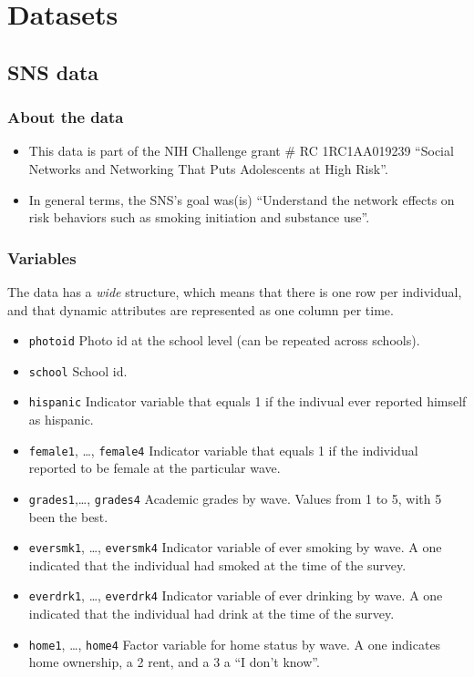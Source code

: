 \documentclass[]{book}
\theoremstyle{definition}
\theoremstyle{definition}
\theoremstyle{definition}
\theoremstyle{remark}
\begin{document}
\cleardoublepage 

\appendix


\chapter{Datasets}\label{datasets}

\hypertarget{sns-data}{\section{SNS data}\label{sns-data}}

\subsection{About the data}\label{about-the-data}

\begin{itemize}
\item
  This data is part of the NIH Challenge grant \# RC 1RC1AA019239
  ``Social Networks and Networking That Puts Adolescents at High Risk''.
\item
  In general terms, the SNS's goal was(is) ``Understand the network
  effects on risk behaviors such as smoking initiation and substance
  use''.
\end{itemize}

\subsection{Variables}\label{variables}

The data has a \emph{wide} structure, which means that there is one row
per individual, and that dynamic attributes are represented as one
column per time.

\begin{itemize}
\item
  \texttt{photoid} Photo id at the school level (can be repeated across
  schools).
\item
  \texttt{school} School id.
\item
  \texttt{hispanic} Indicator variable that equals 1 if the indivual
  ever reported himself as hispanic.
\item
  \texttt{female1}, \ldots{}, \texttt{female4} Indicator variable that
  equals 1 if the individual reported to be female at the particular
  wave.
\item
  \texttt{grades1},\ldots{}, \texttt{grades4} Academic grades by wave.
  Values from 1 to 5, with 5 been the best.
\item
  \texttt{eversmk1}, \ldots{}, \texttt{eversmk4} Indicator variable of
  ever smoking by wave. A one indicated that the individual had smoked
  at the time of the survey.
\item
  \texttt{everdrk1}, \ldots{}, \texttt{everdrk4} Indicator variable of
  ever drinking by wave. A one indicated that the individual had drink
  at the time of the survey.
\item
  \texttt{home1}, \ldots{}, \texttt{home4} Factor variable for home
  status by wave. A one indicates home ownership, a 2 rent, and a 3 a
  ``I don't know''.
\end{itemize}
\end{document}
